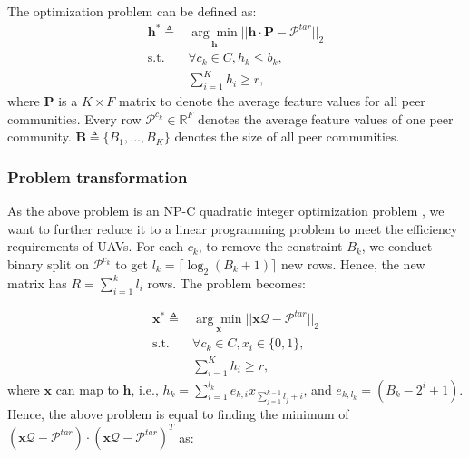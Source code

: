 \documentclass[lettersize,journal]{IEEEtran}
\begin{document}
The optimization problem can be defined as:
\begin{equation}\label{eq:problem}
\begin{aligned}
\mathbf{h}^*\triangleq &\underset{\mathbf{h}}{\arg \min} \vert\vert \mathbf{h}\cdot\mathbf{P}-\mathcal{P}^{tar}\vert\vert_2 \\
\text{s.t. }& \forall c_k \in C, h_k\leq b_k, \\
&\sum_{i=1} ^K h_i\geq r,
\end{aligned}
\end{equation}
where $\mathbf{P}$ is a $K \times F$ matrix to denote the average feature values for all peer communities. Every row $\mathcal{P}^{c_k}\in \mathbb{R}^F$ denotes the average feature values of one peer community. $\mathbf{B}\triangleq \{ B_{1}, \ldots, B_{K}\}$ denotes the size of all peer communities.

\subsubsection{Problem transformation} As the above problem is an NP-C quadratic integer optimization problem \cite{murty1985some}, we want to further reduce it to a linear programming problem to meet the efficiency requirements of UAVs. 
For each $c_k$, to remove the constraint $B_k$, we conduct binary split on $\mathcal{P}^{c_k}$ to get $l_k=\lceil \log_2(B_k+1) \rceil$ new rows. Hence, the new matrix has $R=\sum_{i=1}^k l_i$ rows. The problem becomes:

\begin{equation}
\begin{aligned}
\mathbf{x}^*\triangleq &\underset{\mathbf{x}}{\arg \min} \vert\vert \mathbf{x}\mathcal{Q}-\mathcal{P}^{tar}\vert\vert_2 \\
\text{s.t. } &\forall c_k \in C, x_i\in\{0,1\}, \\
&\sum_{i=1} ^K h_i\geq r,
\end{aligned}
\end{equation} 
where $\mathbf{x}$ can map to $\mathbf{h}$, i.e., $h_k = \sum _{i=1} ^{l_k} e_{k,i}x_{\sum_{j=1}^{k-1} l_j +i}$, and $e_{k,l_k}=(B_k-2^i+1)$. Hence, the above problem is equal to finding the minimum of $(\mathbf{x}\mathcal{Q}-\mathcal{P}^{tar})\cdot (\mathbf{x}\mathcal{Q}-\mathcal{P}^{tar})^T$ as:
\end{document}
